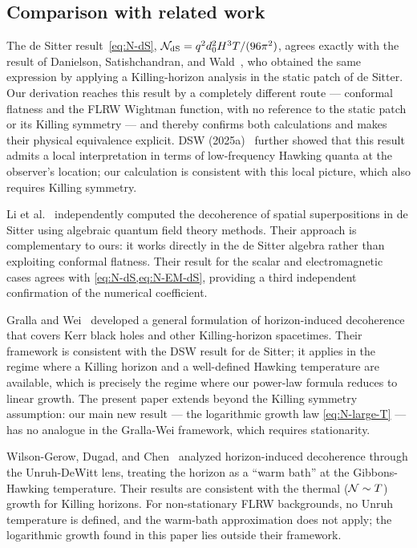 \subsection{Comparison with related work}
\label{sec:discussion-comparison}

The de Sitter result~\cref{eq:N-dS},
$\mathcal{N}_{\rm dS} = q^2 d_0^2 H^3 T/(96\pi^2)$, agrees exactly with the
result of Danielson, Satishchandran, and Wald~\cite{Danielson:2022tdw}, who
obtained the same expression by applying a Killing-horizon analysis in the static
patch of de Sitter.  Our derivation reaches this result by a completely different
route — conformal flatness and the FLRW Wightman function, with no reference to
the static patch or its Killing symmetry — and thereby confirms both calculations
and makes their physical equivalence explicit.  DSW (2025a)~\cite{Danielson:2024yge}
further showed that this result admits a local interpretation in terms of
low-frequency Hawking quanta at the observer's location; our calculation is
consistent with this local picture, which also requires Killing symmetry.

Li et al.~\cite{Li:2024} independently computed the decoherence of spatial
superpositions in de Sitter using algebraic quantum field theory methods.  Their
approach is complementary to ours: it works directly in the de Sitter algebra
rather than exploiting conformal flatness.  Their result for the scalar and
electromagnetic cases agrees with \cref{eq:N-dS,eq:N-EM-dS}, providing a
third independent confirmation of the numerical coefficient.

Gralla and Wei~\cite{Gralla:2023oya} developed a general formulation of
horizon-induced decoherence that covers Kerr black holes and other Killing-horizon
spacetimes.  Their framework is consistent with the DSW result for de Sitter; it
applies in the regime where a Killing horizon and a well-defined Hawking
temperature are available, which is precisely the regime where our power-law
formula reduces to linear growth.  The present paper extends beyond the Killing
symmetry assumption: our main new result — the logarithmic growth law
\cref{eq:N-large-T} — has no analogue in the Gralla-Wei framework, which requires
stationarity.

Wilson-Gerow, Dugad, and Chen~\cite{WilsonGerow:2024} analyzed horizon-induced
decoherence through the Unruh-DeWitt lens, treating the horizon as a ``warm
bath'' at the Gibbons-Hawking temperature.  Their results are consistent with the
thermal ($\mathcal{N} \sim T$) growth for Killing horizons.  For non-stationary FLRW
backgrounds, no Unruh temperature is defined, and the warm-bath approximation
does not apply; the logarithmic growth found in this paper lies outside their
framework.

